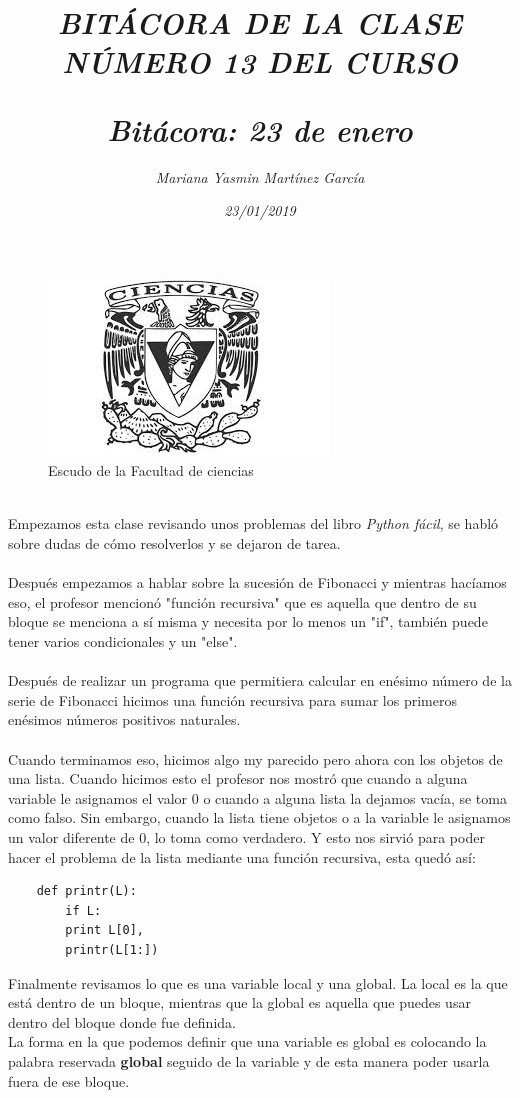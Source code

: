 \documentclass{article}
\title{\Huge\item\color{purple}\textit{BITÁCORA DE LA CLASE NÚMERO 13 DEL CURSO}}
\author{\Large\textit{ Mariana Yasmin Martínez García}}
\date{\Large\textit{ 23/01/2019}}
\begin{document}
\begin{figure}[t]
	\centering
	\includegraphics[width=0.8\linewidth]{Imagenes/1}
	\caption{Escudo de la Facultad de ciencias}
	\label{fig:1}
\end{figure}
	\maketitle
		
	\newpage
	
	\title{\Huge\textbf{\color{purple}\textit{Bitácora: 23 de enero\\}}} \\
	Empezamos esta clase revisando unos problemas del libro \textit{Python fácil}, se habló sobre  dudas de cómo resolverlos y se dejaron de tarea. \\ \\
	Después empezamos a hablar sobre la sucesión de Fibonacci y mientras hacíamos eso, el profesor mencionó "función recursiva" que es aquella que dentro de su bloque se menciona a sí misma y necesita por lo menos un "if", también puede tener varios condicionales y un "else". \\ \\
	Después de realizar un programa que permitiera calcular en enésimo número de la serie de Fibonacci hicimos una función recursiva para sumar los primeros enésimos números positivos naturales. \\ \\
	Cuando terminamos eso, hicimos algo my parecido pero ahora con los objetos de una lista. Cuando hicimos esto el profesor nos mostró que cuando a alguna variable le asignamos el valor 0 o cuando a alguna lista la dejamos vacía, se toma como falso. Sin embargo, cuando la lista tiene objetos o a la variable le asignamos un valor diferente de 0, lo toma como verdadero. Y esto nos sirvió para poder hacer el problema de la lista mediante una función recursiva, esta quedó así:  \\
	\begin{verbatim}
	def printr(L):
		if L: 
		print L[0],
		printr(L[1:])
	\end{verbatim}
	Finalmente revisamos lo que es una variable local y una global. La local es la que está dentro de un bloque, mientras que la global es aquella que puedes usar dentro del bloque donde fue definida. \\
	La forma en la que podemos definir que una variable es global es colocando la palabra reservada \textbf{global} seguido de la variable y de esta manera poder usarla fuera de ese bloque.
\end{document}
